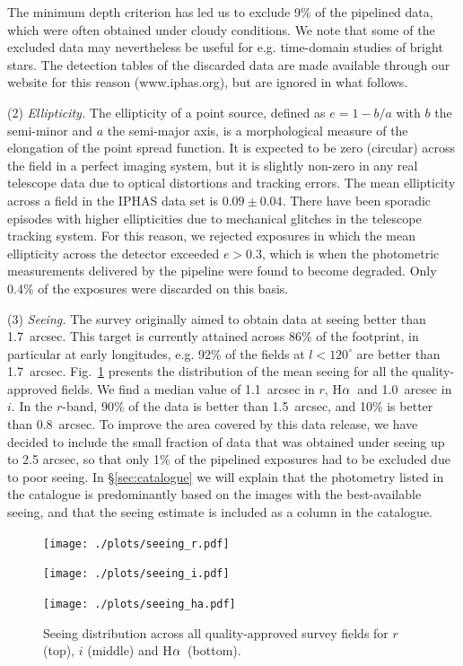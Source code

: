 \documentclass[useAMS,usenatbib]{mn2e}
\def\ha{\mbox{H$\rm \alpha$}}
\begin{document}
The minimum depth criterion
has led us to exclude 9\% of the pipelined data,
which were often obtained under cloudy conditions.
We note that some of the excluded data may nevertheless be useful
for e.g. time-domain studies of bright stars.
The detection tables of the discarded data are made
available through our website for this reason (www.iphas.org),
but are ignored in what follows.

(2) \emph{Ellipticity.} 
The ellipticity of a point source,
defined as $e = 1 - b / a$ 
with $b$ the semi-minor and $a$ the semi-major axis,
is a morphological measure of the elongation of the point spread function.
It is expected to be zero (circular) across the field 
in a perfect imaging system,
but it is slightly non-zero in any real telescope data 
due to optical distortions and tracking errors.
The mean ellipticity across a field in the IPHAS data set 
is $0.09\pm0.04$.
There have been sporadic episodes with higher ellipticities
due to mechanical glitches in the telescope tracking system.
For this reason, we rejected exposures in which the mean ellipticity
across the detector exceeded $e > 0.3$,
which is when the photometric measurements delivered by the pipeline
were found to become degraded.
Only 0.4\% of the exposures were discarded on this basis.

(3) \emph{Seeing.} 
The survey originally aimed to obtain data 
at seeing better than 1.7~arcsec.
This target is currently attained across 86\% of the footprint,
in particular at early longitudes,
e.g. 92\% of the fields at $l<120^\circ$ are better than 1.7~arcsec.
Fig.~\ref{fig:seeing} presents the distribution
of the mean seeing for all the quality-approved fields.
We find a median value of 1.1~arcsec in $r$, \ha\
and 1.0~arcsec in $i$.
In the $r$-band, 90\% of the data is better than 1.5~arcsec,
and 10\% is better than 0.8~arcsec.
To improve the area covered by this data release,
we have decided to include the small fraction of data
that was obtained under seeing up to 2.5 arcsec,
so that only 1\% of the pipelined exposures
had to be excluded due to poor seeing.
In \S\ref{sec:catalogue} we will explain
that the photometry listed in the catalogue
is predominantly based on the images with the
best-available seeing, and that the seeing estimate
is included as a column in the catalogue.

\begin{figure}
    \begin{minipage}[b]{\linewidth}
        \texttt{[image: ./plots/seeing\_r.pdf]} 
    \end{minipage}
    \begin{minipage}[b]{\linewidth}
        \texttt{[image: ./plots/seeing\_i.pdf]} 
    \end{minipage}
    \begin{minipage}[b]{\linewidth}
        \texttt{[image: ./plots/seeing\_ha.pdf]} 
    \end{minipage}
    \caption{Seeing distribution across all
             quality-approved survey fields
             for $r$ (top), $i$ (middle) and \ha\ (bottom).}
    \label{fig:seeing}
\end{figure}
\end{document}
